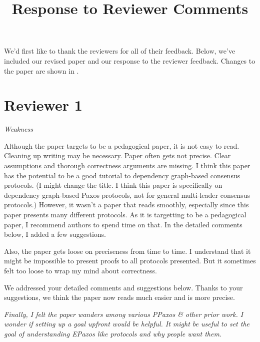 \documentclass[letterpaper,twocolumn,10pt]{article}
\newenvironment{reviewerquote}
{\list{}{\leftmargin=\parindent\rightmargin=0in}\item[] \itshape \color{ReviewerDarkGray}}%
{\endlist}
\begin{document}
\title{Response to Reviewer Comments}

\maketitle

\thispagestyle{empty}

We'd first like to thank the reviewers for all of their feedback. Below, we've
included our revised paper and our response to the reviewer feedback. Changes
to the paper are shown in .

\section*{Reviewer 1}
\begin{reviewerquote}
  Weakness

  Although the paper targets to be a pedagogical paper, it is not easy to read.
  Cleaning up writing may be necessary.  Paper often gets not precise. Clear
  assumptions and thorough correctness arguments are missing.  I think this
  paper has the potential to be a good tutorial to dependency graph-based
  consensus protocols. (I might change the title. I think this paper is
  specifically on dependency graph-based Paxos protocols, not for general
  multi-leader consensus protocols.) However, it wasn't a paper that reads
  smoothly, especially since this paper presents many different protocols. As
  it is targetting to be a pedagogical paper, I recommend authors to spend time
  on that. In the detailed comments below, I added a few suggestions.

  Also, the paper gets loose on preciseness from time to time. I understand
  that it might be impossible to present proofs to all protocols presented. But
  it sometimes felt too loose to wrap my mind about correctness.
\end{reviewerquote}

We addressed your detailed comments and suggestions below. Thanks to your
suggestions, we think the paper now reads much easier and is more precise.

\begin{reviewerquote}
  Finally, I felt the paper wanders among various PPaxos \& other prior work. I
  wonder if setting up a goal upfront would be helpful. It might be useful to
  set the goal of understanding EPaxos like protocols and why people want them.
\end{reviewerquote}
\end{document}

